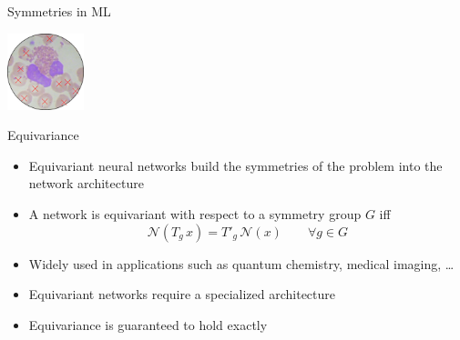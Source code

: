 \documentclass[
                20pt,
                final,
                hyperref={%
                    breaklinks=true,%
                    letterpaper=true,%
                    colorlinks,%
                    bookmarks=false%
                }]{beamer}
\newlength{\onecolwid}
\begin{document}
\begin{frame}[t]
\begin{columns}[t]
\begin{column}{\onecolwid}
\begin{alertblock}{\Large{Symmetries in ML}}
\begin{center}
                        \includegraphics[width=6em]{img/cells_rotated_labeled_edge.png}
                    \end{center}
                \end{alertblock}
                \medskip
                \begin{alertblock}{\Large{Equivariance}}
                        \begin{itemize}
                            \item Equivariant neural networks build the symmetries of the problem into the network architecture
                            \item A network is equivariant with respect to a symmetry group $ G $ iff \[ \mathcal{N}(T_g\, x)= T'_g\, \mathcal{N}(x)\qquad  \forall g\in G \]
                            \item Widely used in applications such as quantum chemistry, medical imaging, \dots
                            \item Equivariant networks require a specialized architecture
                            \item Equivariance is guaranteed to hold exactly

                        \end{itemize}




\end{alertblock}
\end{column}
\end{columns}
\end{frame}
\end{document}
